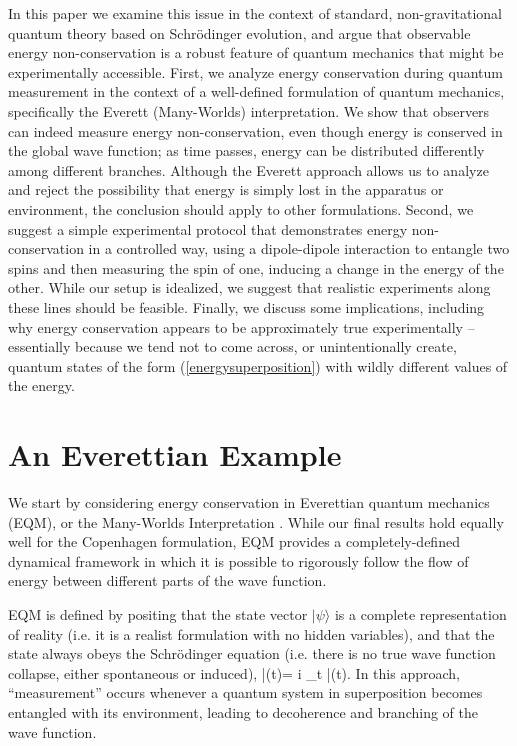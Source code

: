 \documentclass[aps,prd,onecolumn,nofootinbib,notitlepage]{revtex4-1}
\begin{document}
In this paper we examine this issue in the context of standard, non-gravitational quantum theory based on Schr\"odinger evolution, and argue that observable energy non-conservation is a robust feature of quantum mechanics that might be experimentally accessible.
First, we analyze energy conservation during quantum measurement in the context of a well-defined formulation of quantum mechanics, specifically the Everett (Many-Worlds) interpretation.
We show that observers can indeed measure energy non-conservation, even though energy is conserved in the global wave function; as time passes, energy can be distributed differently among different branches.
Although the Everett approach allows us to analyze and reject the possibility that energy is simply lost in the apparatus or environment, the conclusion should apply to other formulations.
Second, we suggest a simple experimental protocol that demonstrates energy non-conservation in a controlled way, using a dipole-dipole interaction to entangle two spins and then measuring the spin of one, inducing a change in the energy of the other.
While our setup is idealized, we suggest that realistic experiments along these lines should be feasible.
Finally, we discuss some implications, including why energy conservation appears to be approximately true experimentally -- essentially because we tend not to come across, or unintentionally create, quantum states of the form (\ref{energysuperposition}) with wildly different values of the energy.

\section{An Everettian Example}

We start by considering energy conservation in Everettian quantum mechanics (EQM), or the Many-Worlds Interpretation \cite{Everett:1957hd,Wallace:2012zla}.
While our final results hold equally well for the Copenhagen formulation, EQM provides a completely-defined dynamical framework in which it is possible to rigorously follow the flow of energy between different parts of the wave function.

EQM is defined by positing that the state vector $|\psi\rangle$ is a complete representation of reality (i.e. it is a realist formulation with no hidden variables), and that the state always obeys the Schr\"odinger equation (i.e. there is no true wave function collapse, either spontaneous or induced),
\be
  \ham |\psi(t)\rangle = i \partial_t |\psi(t)\rangle.
\ee
In this approach, ``measurement'' occurs whenever a quantum system in superposition becomes entangled with its environment, leading to decoherence and branching of the wave function.
\end{document}
